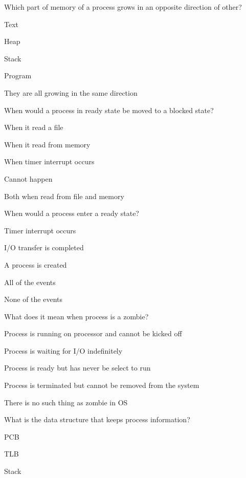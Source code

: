 \begin{questions}\setlength{\itemsep}{0.08cm}\setcounter{question}{6}
\question Which part of memory of a process grows in an opposite direction of other?
\begin{verticalchoices}
\item Text
\item Heap
\item Stack
\item Program
\item They are all growing in the same direction
\end{verticalchoices}
\question When would a process in ready state be moved to a blocked state?
\begin{verticalchoices}
\item When it read a file
\item When it read from memory
\item When timer interrupt occurs
\item Cannot happen
\item Both when read from file and memory
\end{verticalchoices}
\question When would a process enter a ready state?
\begin{verticalchoices}
\item Timer interrupt occurs
\item I/O transfer is completed
\item A process is created
\item All of the events
\item None of the events
\end{verticalchoices}
\question What does it mean when process is a zombie?
\begin{verticalchoices}
\item Process is running on processor and cannot be kicked off
\item Process is waiting for I/O indefinitely
\item Process is ready but has never be select to run
\item Process is terminated but cannot be removed from the system
\item There is no such thing as zombie in OS
\end{verticalchoices}
\question What is the data structure that keeps process information?
\begin{verticalchoices}
\item PCB
\item TLB
\item Stack

\end{verticalchoices}
\end{questions}

